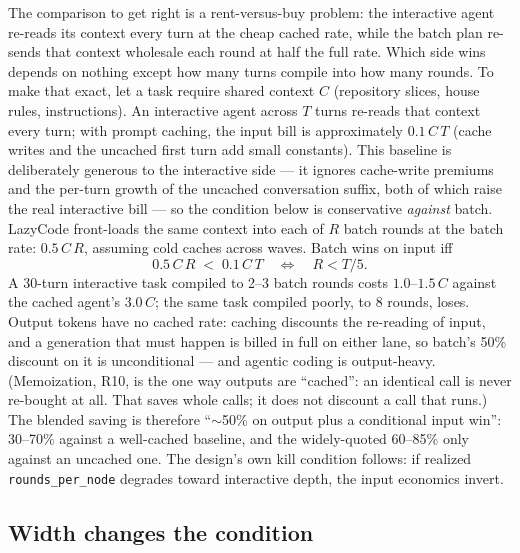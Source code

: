 \documentclass[11pt]{article}
\begin{document}
The comparison to get right is a rent-versus-buy problem: the interactive agent re-reads its context every turn at the cheap cached rate, while the batch plan re-sends that context wholesale each round at half the full rate. Which side wins depends on nothing except how many turns compile into how many rounds. To make that exact, let a task require shared context $C$ (repository slices, house rules, instructions). An interactive agent across $T$ turns re-reads that context every turn; with prompt caching, the input bill is approximately $0.1\,C\,T$ (cache writes and the uncached first turn add small constants). This baseline is deliberately generous to the interactive side --- it ignores cache-write premiums and the per-turn growth of the uncached conversation suffix, both of which raise the real interactive bill --- so the condition below is conservative \emph{against} batch. LazyCode front-loads the same context into each of $R$ batch rounds at the batch rate: $0.5\,C\,R$, assuming cold caches across waves. Batch wins on input iff
\[
0.5\,C\,R \;<\; 0.1\,C\,T \quad\Longleftrightarrow\quad \boxed{R < T/5}.
\]
A 30-turn interactive task compiled to 2--3 batch rounds costs $1.0$--$1.5\,C$ against the cached agent's $3.0\,C$; the same task compiled poorly, to 8 rounds, loses. Output tokens have no cached rate: caching discounts the re-reading of input, and a generation that must happen is billed in full on either lane, so batch's 50\% discount on it is unconditional --- and agentic coding is output-heavy. (Memoization, R10, is the one way outputs are ``cached'': an identical call is never re-bought at all. That saves whole calls; it does not discount a call that runs.) The blended saving is therefore ``$\sim$50\% on output plus a conditional input win'': 30--70\% against a well-cached baseline, and the widely-quoted 60--85\% only against an uncached one. The design's own kill condition follows: if realized \texttt{rounds\_per\_node} degrades toward interactive depth, the input economics invert.

\subsection{Width changes the condition}
\label{sec:economics-width}
\end{document}
